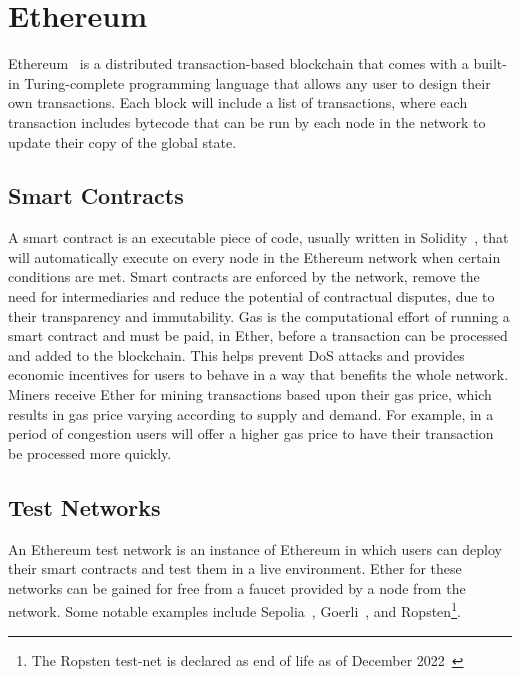 
\section{Ethereum}

Ethereum~\cite{vujicic_blockchain_2018,dannen_introducing_2017} is a distributed transaction-based blockchain that comes with a built-in Turing-complete programming language that allows any user to design their own transactions. Each block will include a list of transactions, where each transaction includes bytecode that can be run by each node in the network to update their copy of the global state.

\subsection*{Smart Contracts}

A smart contract is an executable piece of code, usually written in Solidity~\cite{noauthor_solidity_nodate}, that will automatically execute on every node in the Ethereum network when certain conditions are met. Smart contracts are enforced by the network, remove the need for intermediaries and reduce the potential of contractual disputes, due to their transparency and immutability.
\x
Gas is the computational effort of running a smart contract and must be paid, in Ether, before a transaction can be processed and added to the blockchain. This helps prevent DoS attacks and provides economic incentives for users to behave in a way that benefits the whole network.
\x
Miners receive Ether for mining transactions based upon their gas price, which results in gas price varying according to supply and demand. For example, in a period of congestion users will offer a higher gas price to have their transaction be processed more quickly.

\subsection*{Test Networks}

An Ethereum test network is an instance of Ethereum in which users can deploy their smart contracts and test them in a live environment. Ether for these networks can be gained for free from a faucet provided by a node from the network. Some notable examples include Sepolia~\cite{noauthor_sepolia_nodate}, Goerli~\cite{noauthor_goerli_nodate}, and Ropsten\footnote{The Ropsten test-net is declared as end of life as of December 2022~\cite{noauthor_ropsten_2023}}.